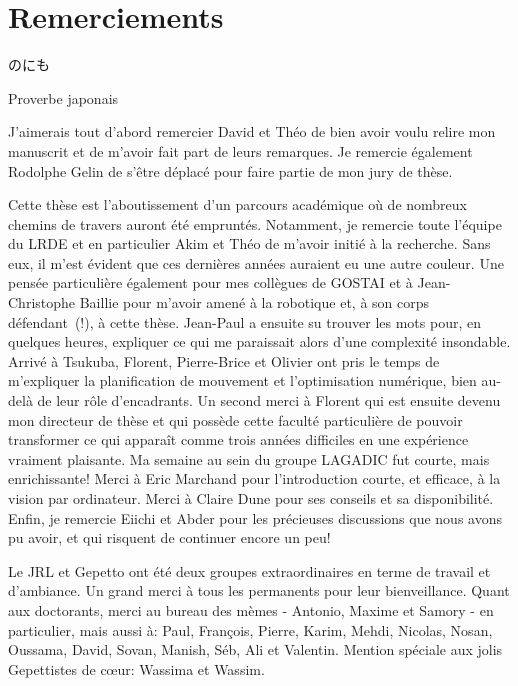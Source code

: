 \chapter*{Remerciements}\label{chap:merci}

\epigraph{\begin{CJK*}{UTF8}{min}%
    のにも%
\end{CJK*}}{Proverbe japonais}

J'aimerais tout d'abord remercier David et Théo de bien avoir voulu
relire mon manuscrit et de m'avoir fait part de leurs remarques. Je
remercie également Rodolphe Gelin de s'être déplacé pour faire partie
de mon jury de thèse.


Cette thèse est l'aboutissement d'un parcours académique où de
nombreux chemins de travers auront été empruntés. Notamment, je
remercie toute l'équipe du LRDE et en particulier Akim et Théo de
m'avoir initié à la recherche. Sans eux, il m'est évident que ces
dernières années auraient eu une autre couleur. Une pensée
particulière également pour mes collègues de GOSTAI et à
Jean-Christophe Baillie pour m'avoir amené à la robotique et, à son
corps défendant~(!), à cette thèse. Jean-Paul a ensuite su trouver les
mots pour, en quelques heures, expliquer ce qui me paraissait alors
d'une complexité insondable. Arrivé à Tsukuba, Florent, Pierre-Brice et
Olivier ont pris le temps de m'expliquer la planification de mouvement
et l'optimisation numérique, bien au-delà de leur rôle
d'encadrants. Un second merci à Florent qui est ensuite devenu mon
directeur de thèse et qui possède cette faculté particulière de
pouvoir transformer ce qui apparaît comme trois années difficiles en
une expérience vraiment plaisante. Ma semaine au sein du groupe
LAGADIC fut courte, mais enrichissante! Merci à Eric Marchand pour
l'introduction courte, et efficace, à la vision par ordinateur. Merci
à Claire Dune pour ses conseils et sa disponibilité. Enfin, je
remercie Eiichi et Abder pour les précieuses discussions que nous
avons pu avoir, et qui risquent de continuer encore un peu!


Le JRL et Gepetto ont été deux groupes extraordinaires en terme de
travail et d'ambiance. Un grand merci à tous les permanents pour leur
bienveillance. Quant aux doctorants, merci au bureau des mèmes -
Antonio, Maxime et Samory - en particulier, mais aussi à: Paul,
François, Pierre, Karim, Mehdi, Nicolas, Nosan, Oussama, David, Sovan,
Manish, Séb, Ali et Valentin. Mention spéciale aux jolis Gepettistes
de c\oe ur: Wassima et Wassim.


